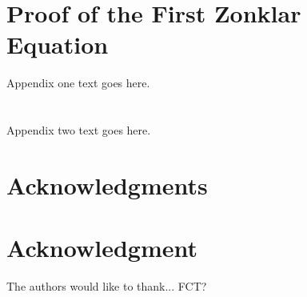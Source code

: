\documentclass[10pt,journal,compsoc]{IEEEtran}
\begin{document}

%


\appendices
\section{Proof of the First Zonklar Equation}
Appendix one text goes here.

\section{}
Appendix two text goes here.


\ifCLASSOPTIONcompsoc
  \section*{Acknowledgments}
\else
  \section*{Acknowledgment}
\fi


The authors would like to thank... FCT?


\ifCLASSOPTIONcaptionsoff
  \newpage
\fi
\end{document}
